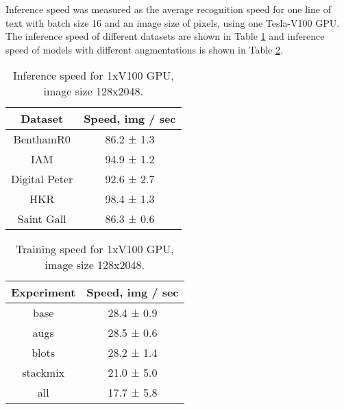 \documentclass[10pt,twocolumn,letterpaper]{article}
\begin{document}
Inference speed was measured as the average recognition speed for one line of text with batch size 16 and an image size of  pixels, using one Tesla-V100 GPU. The inference speed of different datasets are shown in Table \ref{tab:inference_speed} and inference speed of models with different augmentations is shown in Table \ref{tab:inference_speed2}.


\begin{table}

  \begin{center}
    \begin{tabular}{ |c|c| }
    \hline
\textbf{Dataset} &  \textbf{Speed, img / sec}  \\
\hline
    BenthamR0 & 86.2 ± 1.3 \\
    IAM & 94.9 ± 1.2 \\
    Digital Peter & 92.6 ± 2.7 \\
    HKR & 98.4 ± 1.3 \\
    Saint Gall & 86.3 ± 0.6 \\
\hline
    \end{tabular}
    \end{center}
  \caption{ \label{tab:inference_speed}Inference speed for 1xV100 GPU, image size 128x2048.}
\end{table}

\begin{table}

    \begin{center}
    \begin{tabular}{ |c|c| }
    \hline
\textbf{Experiment} &  \textbf{Speed, img / sec}  \\
\hline
    base & 28.4 ± 0.9 \\
    augs & 28.5 ± 0.6 \\
    blots & 28.2 ± 1.4 \\
    stackmix & 21.0 ± 5.0 \\
    all & 17.7 ± 5.8 \\
\hline
    \end{tabular}
    \end{center}
    \caption{\label{tab:inference_speed2}Training speed for 1xV100 GPU, image size 128x2048.}
\end{table}
\end{document}
